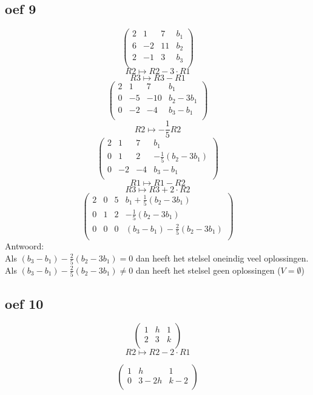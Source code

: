 \documentclass[10pt,a4paper]{article}
\begin{document}
\subsection*{oef 9}
\[
\begin{pmatrix}
2 &  1 &  7 & b_1\\
6 & -2 & 11 & b_2 \\
2 & -1 &  3 & b_3\\
\end{pmatrix}
\]
\[ R2 \longmapsto R2 -3\cdot R1\]
\[ R3 \longmapsto R3 - R1\]
\[
\begin{pmatrix}
2 &  1 &  7 & b_1\\
0 & -5 & -10& b_2-3b_1 \\
0 & -2 &  -4& b_3-b_1\\
\end{pmatrix}
\]
\[ R2 \longmapsto -\frac{1}{5} R2\]
\[
\begin{pmatrix}
2 &  1 &  7 & b_1\\
0 &  1 &  2 & -\frac{1}{5}(b_2-3b_1) \\
0 & -2 &  -4& b_3-b_1\\
\end{pmatrix}
\]
\[ R1 \longmapsto R1 - R2\]
\[ R3 \longmapsto R3 + 2 \cdot	R2\]
\[
\begin{pmatrix}
2 &  0 &  5 & b_1 + \frac{1}{5}(b_2-3b_1)\\
0 &  1 &  2 & -\frac{1}{5}(b_2-3b_1) \\
0 &  0 &  0 & (b_3-b_1) - \frac{2}{5}(b_2-3b_1)\\
\end{pmatrix}
\]
Antwoord:\\
Als $(b_3-b_1) - \frac{2}{5}(b_2-3b_1) = 0$ dan heeft het stelsel oneindig veel oplossingen.
Als $(b_3-b_1) - \frac{2}{5}(b_2-3b_1) \neq 0$ dan heeft het stelsel geen oplossingen ($V=\emptyset$)

\subsection*{oef 10}
\[
\begin{pmatrix}
1 & h & 1\\
2 & 3 & k\\
\end{pmatrix}
\]
\[ R2 \longmapsto R2 - 2 \cdot R1\]

\[
\begin{pmatrix}
1 & h & 1\\
0 & 3-2h & k-2\\
\end{pmatrix}
\]
\end{document}
